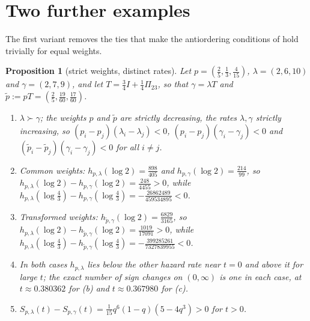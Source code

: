 \documentclass[10pt]{article}
\theoremstyle{plain}
\newtheorem{proposition}[theorem]{Proposition}
\theoremstyle{definition}
\theoremstyle{remark}
\begin{document}
\section{Two further examples}\label{sec:variants}

The first variant removes the ties that make the antiordering conditions of \cite{ShojaeeAsadiFinkelstein2022,SahooKayalFinkelstein2026} hold trivially for equal weights.

\begin{proposition}[strict weights, distinct rates]\label{prop:strict}
Let $p=(\tfrac25,\tfrac13,\tfrac{4}{15})$, $\lambda=(2,6,10)$ and $\gamma=(2,7,9)$, and let $T=\tfrac34I+\tfrac14\Pi_{23}$, so that $\gamma=\lambda T$ and $\tilde p:=pT=(\tfrac25,\tfrac{19}{60},\tfrac{17}{60})$.
\begin{enumerate}
\item[(a)] $\lambda\succ\gamma$; the weights $p$ and $\tilde p$ are strictly decreasing, the rates $\lambda,\gamma$ strictly increasing, so $(p_i-p_j)(\lambda_i-\lambda_j)<0$, $(p_i-p_j)(\gamma_i-\gamma_j)<0$ and $(\tilde p_i-\tilde p_j)(\gamma_i-\gamma_j)<0$ for all $i\ne j$.
\item[(b)] Common weights: $h_{p,\lambda}(\log 2)=\tfrac{898}{405}$ and $h_{p,\gamma}(\log 2)=\tfrac{214}{99}$, so $h_{p,\lambda}(\log 2)-h_{p,\gamma}(\log 2)=\tfrac{248}{4455}>0$, while $h_{p,\lambda}(\log\tfrac43)-h_{p,\gamma}(\log\tfrac43)=-\tfrac{26862489}{459534895}<0$.
\item[(c)] Transformed weights: $h_{\tilde p,\gamma}(\log 2)=\tfrac{6829}{3165}$, so $h_{p,\lambda}(\log 2)-h_{\tilde p,\gamma}(\log 2)=\tfrac{1019}{17091}>0$, while $h_{p,\lambda}(\log\tfrac43)-h_{\tilde p,\gamma}(\log\tfrac43)=-\tfrac{399285261}{7327839955}<0$.
\item[(d)] In both cases $h_{p,\lambda}$ lies below the other hazard rate near $t=0$ and above it for large $t$; the exact number of sign changes on $(0,\infty)$ is one in each case, at $t\approx 0.380362$ for (b) and $t\approx 0.367980$ for (c).
\item[(e)] $S_{p,\lambda}(t)-S_{p,\gamma}(t)=\tfrac{1}{15}q^6(1-q)(5-4q^3)>0$ for $t>0$.
\end{enumerate}
\end{proposition}
\end{document}

